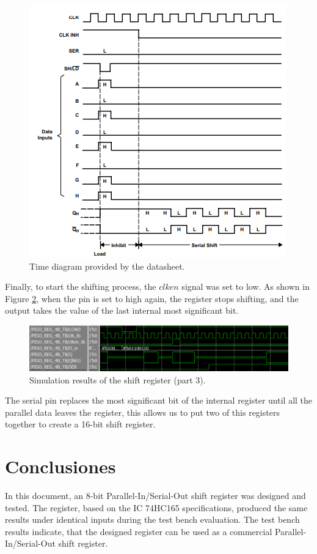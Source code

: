 \documentclass[9pt,technote]{IEEEtran}
\begin{document}
	\begin{figure}[H]
		\centering
		\includegraphics[width=0.7\columnwidth]{"time_diagram datasheet"}
		\caption{Time diagram provided by the datasheet.\cite{}}
		\label{fig:timediagram-datasheet}
	\end{figure}
	
	Finally, to start the shifting process, the $clken$ signal was set to low. As shown in Figure \ref{fig:timediagram3}, when the pin is set to high again, the register stops shifting, and the output takes the value of the last internal most significant bit.
	
	\begin{figure}[H]
		\centering
		\includegraphics[width=\columnwidth]{time_diagram3}
		\caption{Simulation results of the shift register (part 3).}
		\label{fig:timediagram3}
	\end{figure}
	
	
	The serial pin replaces the most significant bit of the internal register until all the parallel data leaves the register, this allows us to put two of this registers together to create a 16-bit shift register.
	
	
	
	
	\section{Conclusiones}
	In this document, an 8-bit Parallel-In/Serial-Out shift register was designed and tested. The register, based on the IC 74HC165 specifications, produced the same results under identical inputs during the test bench evaluation. The test bench results indicate, that the designed register can be used as a commercial Parallel-In/Serial-Out shift register. 
	
	
	
	
	
	
	
	
	
	
	
	
	
	
	
	
	
	
	
	
\end{document}
